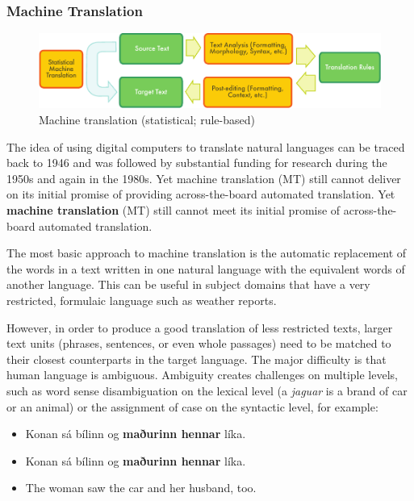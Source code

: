 \documentclass{../../metanetpaper}
\begin{document}
\begin{multicols}{2}
\subsubsection{Machine Translation}

\begin{figure}[htb]
  \center
  \includegraphics[width=\textwidth]{../_media/english/machine_translation}
  \caption{Machine translation (statistical; rule-based)}
  \label{fig:mtarch_en}
\end{figure}

The idea of using digital computers to translate natural languages can be traced back to 1946 and was followed by substantial funding for research during the 1950s and again in the 1980s. 
Yet machine translation (MT) still cannot deliver on its initial promise of providing across-the-board automated translation.  
 Yet \textbf{machine translation} (MT) still cannot meet its initial promise of across-the-board automated translation. 

The most basic approach to machine translation is the automatic replacement of the words in a text written in one natural language with the equivalent words of another language. This can be useful in subject domains that have a very restricted, formulaic language such as weather reports.

However, in order to produce a good translation of less restricted texts, larger text units (phrases, sentences, or even whole passages) need to be matched to their closest counterparts in the target language. The major difficulty is that human language is ambiguous. Ambiguity creates challenges on multiple levels, such as word sense disambiguation on the lexical level (a \textit{jaguar} is a brand of car or an animal) or the assignment of case on the syntactic level, for example:

\begin{itemize}
\item Konan sá bílinn og \textbf{maðurinn hennar} líka.
\item Konan sá bílinn og \textbf{maðurinn hennar} líka.
\item The woman saw the car and her husband, too.
\end{itemize}


\end{multicols}
\end{document}
